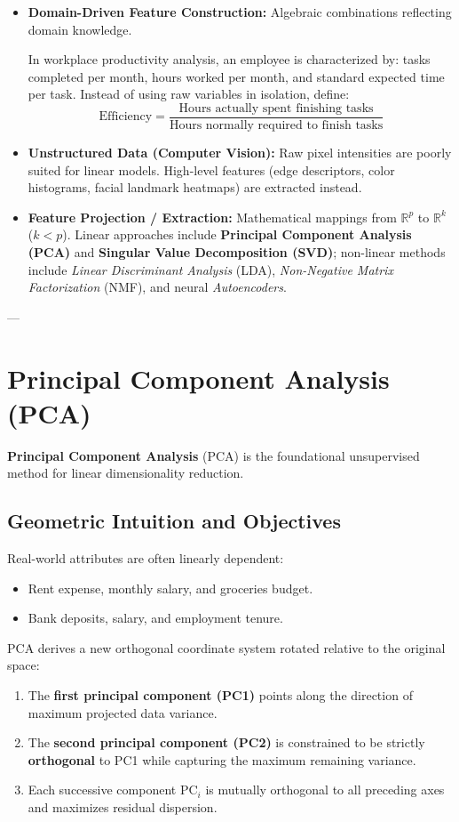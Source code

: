 \begin{itemize}
    \item \textbf{Domain-Driven Feature Construction:} Algebraic combinations reflecting domain knowledge.
    \begin{example}
    In workplace productivity analysis, an employee is characterized by: tasks completed per month, hours worked per month, and standard expected time per task. Instead of using raw variables in isolation, define:
    \begin{equation}
    \text{Efficiency} = \frac{\text{Hours actually spent finishing tasks}}{\text{Hours normally required to finish tasks}}
    \end{equation}
    \end{example}
    \item \textbf{Unstructured Data (Computer Vision):} Raw pixel intensities are poorly suited for linear models. High-level features (edge descriptors, color histograms, facial landmark heatmaps) are extracted instead.
    \item \textbf{Feature Projection / Extraction:} Mathematical mappings from $\mathbb{R}^p$ to $\mathbb{R}^k$ ($k < p$). Linear approaches include \textbf{Principal Component Analysis (PCA)} and \textbf{Singular Value Decomposition (SVD)}; non-linear methods include \textit{Linear Discriminant Analysis} (LDA), \textit{Non-Negative Matrix Factorization} (NMF), and neural \textit{Autoencoders}.
\end{itemize}

---

\section{Principal Component Analysis (PCA)}

\textbf{Principal Component Analysis} (PCA) is the foundational unsupervised method for linear dimensionality reduction.

\subsection{Geometric Intuition and Objectives}
Real-world attributes are often linearly dependent:
\begin{itemize}
    \item Rent expense, monthly salary, and groceries budget.
    \item Bank deposits, salary, and employment tenure.
\end{itemize}
PCA derives a new orthogonal coordinate system rotated relative to the original space:
\begin{enumerate}
    \item The \textbf{first principal component (PC1)} points along the direction of maximum projected data variance.
    \item The \textbf{second principal component (PC2)} is constrained to be strictly \textbf{orthogonal} to PC1 while capturing the maximum remaining variance.
    \item Each successive component $\text{PC}_i$ is mutually orthogonal to all preceding axes and maximizes residual dispersion.
\end{enumerate}

